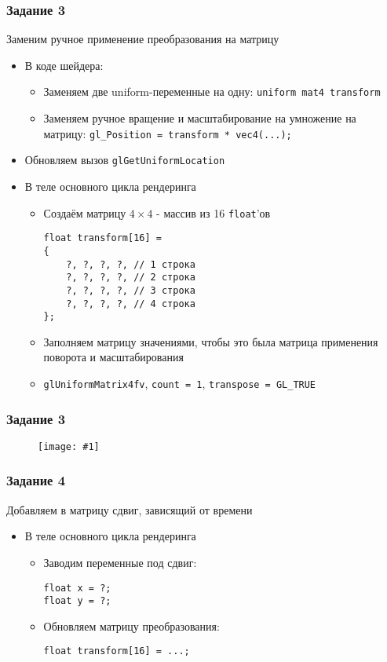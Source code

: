 \documentclass{beamer}
\newcommand{\slideimage}[1]{
  \begin{figure}
    \begin{adjustbox}{width=\textwidth, totalheight=\textheight-2\baselineskip-2\baselineskip,keepaspectratio}
      \texttt{[image: \#1]}
    \end{adjustbox}
  \end{figure}
}
\begin{document}
\begin{frame}[fragile]
\frametitle{Задание 3}
Заменим ручное применение преобразования на матрицу
\begin{itemize}
\item В коде шейдера:
\begin{itemize}
\item Заменяем две uniform-переменные на одну: \verb|uniform mat4 transform|
\item Заменяем ручное вращение и масштабирование на умножение на матрицу: \verb|gl_Position = transform * vec4(...);|
\end{itemize}
\item Обновляем вызов \verb|glGetUniformLocation|
\item В теле основного цикла рендеринга
\begin{itemize}
\item Создаём матрицу \begin{math}4\times 4\end{math} - массив из 16 \verb|float|'ов
\begin{verbatim}
float transform[16] =
{
    ?, ?, ?, ?, // 1 строка
    ?, ?, ?, ?, // 2 строка
    ?, ?, ?, ?, // 3 строка
    ?, ?, ?, ?, // 4 строка
};
\end{verbatim}
\item Заполняем матрицу значениями, чтобы это была матрица применения поворота и масштабирования
\item \verb|glUniformMatrix4fv|, \verb|count = 1|, \verb|transpose = GL_TRUE|
\end{itemize}
\end{itemize}
\end{frame}

\begin{frame}
\frametitle{Задание 3}
\slideimage{2.png}
\end{frame}

\begin{frame}[fragile]
\frametitle{Задание 4}
Добавляем в матрицу сдвиг, зависящий от времени
\begin{itemize}
\item В теле основного цикла рендеринга
\begin{itemize}
\item Заводим переменные под сдвиг:
\begin{verbatim}
float x = ?;
float y = ?;
\end{verbatim}
\item Обновляем матрицу преобразования:
\begin{verbatim}
float transform[16] = ...;
\end{verbatim}
\end{itemize}
\end{itemize}
\end{frame}
\end{document}
